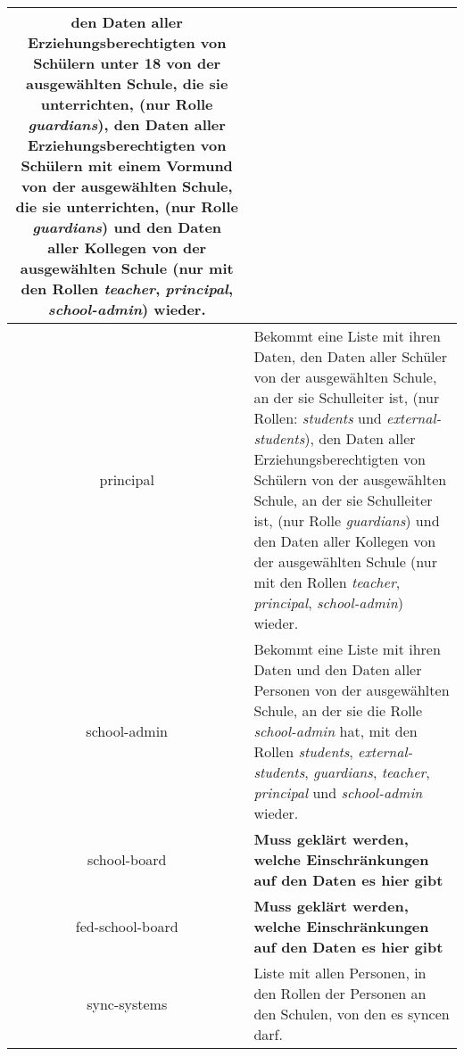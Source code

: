 \begin{longtable}{|c|p{}|}
					den Daten aller Erziehungsberechtigten von Schülern unter 18 von der ausgewählten Schule, die sie unterrichten, (nur Rolle \textit{guardians}),
					den Daten aller Erziehungsberechtigten von Schülern mit einem Vormund von der ausgewählten Schule, die sie unterrichten, (nur Rolle \textit{guardians}) und
					den Daten aller Kollegen von der ausgewählten Schule (nur mit den Rollen \textit{teacher}, \textit{principal}, \textit{school-admin}) 
					wieder.\\ \hline
principal & Bekommt eine Liste mit ihren Daten,
            den Daten aller Schüler von der ausgewählten Schule, an der sie Schulleiter ist, (nur Rollen: \textit{students} und \textit{external-students}),
						den Daten aller Erziehungsberechtigten von Schülern von der ausgewählten Schule, an der sie Schulleiter ist, (nur Rolle \textit{guardians}) und
					  den Daten aller Kollegen von der ausgewählten Schule (nur mit den Rollen \textit{teacher}, \textit{principal}, \textit{school-admin})
						wieder.\\ \hline
school-admin & Bekommt eine Liste mit ihren Daten und
               den Daten aller Personen von der ausgewählten Schule, an der sie die Rolle \textit{school-admin} hat, mit den Rollen \textit{students}, \textit{external-students}, \textit{guardians}, \textit{teacher}, \textit{principal} und \textit{school-admin} wieder.  \\ \hline
school-board & \textcolor[rgb]{1,0.41,0.13}{\textbf{Muss geklärt werden, welche Einschränkungen auf den Daten es hier gibt}} \\ \hline
fed-school-board & \textcolor[rgb]{1,0.41,0.13}{\textbf{Muss geklärt werden, welche Einschränkungen auf den Daten es hier gibt}} \\ \hline
sync-systems & Liste mit allen Personen, in den Rollen der Personen an den Schulen, von den es syncen darf. \\ \hline
	\end{longtable}